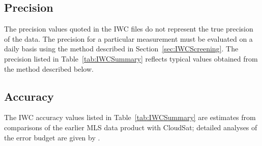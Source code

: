 \subsection{Precision}

The precision values quoted in the IWC files do not represent the true precision of the data. The precision for a particular measurement must be evaluated on a daily basis using the method described in Section~\ref{sec:IWCScreening}. The precision listed in Table~\ref{tab:IWCSummary} reflects typical values obtained from the method described below.

\subsection{Accuracy}

The IWC accuracy values listed in Table~\ref{tab:IWCSummary} are estimates from comparisons of the earlier \vii MLS data product with CloudSat; detailed analyses of the \vii error budget are given by \citet{WuEtal:2008}.

